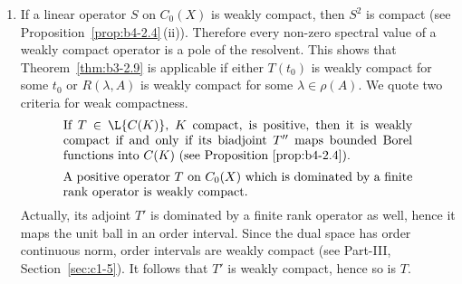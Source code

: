 \begin{remarks}
\begin{enumerate}[\upshape (i), wide, labelindent=.25em]
	We sketch the proof of the equivalence of (a) and (b)
    assuming that $s(A) = 0$.
	If\/ $0$ is a first order pole, then the residue $P$ is a positive projection satisfying $PE = \Kern{A}$, $P'E' = \Kern{A'}$ (see Part-I, Example~\ref{ex:a3-3.6}).
	Thus given $0 < f \in \Kern{A}$ and any $0 \leq \psi \in E'$ such that $\langle f,\psi \rangle > 0$, we have for $\phi \coloneqq P'\psi \in \Kern{A'}$, and
    \[
    \langle f,\phi \rangle = \langle f, P'\psi \rangle = \langle Pf,\psi \rangle = \langle f,\psi \rangle > 0\,.
    \]
	To prove the reverse direction, we first observe that the highest coefficient $Q_{k}$ of the Laurent expansion is a positive operator.
	Thus if\/ $0$ is a pole of order $k \geq 2$, we choose $0 < h \in E$ such that $f \coloneqq Q_{k}h > 0$.
	Then $Af = AQ_{k}h = 0$ and for every $\phi \in \Kern{A'}$ we have 
    \[
    \langle f,\phi \rangle = \langle Q_{k}h,\phi \rangle = \langle h,Q_{k}'\phi \rangle = \langle h,Q_{k-1}'A'\phi \rangle = 0\,.
    \]
	\item 
	If a linear operator $S$ on $C_{0}(X)$ is weakly compact, then $S^{2}$ is compact (see Proposition~\ref{prop:b4-2.4}\,(ii)).
	Therefore every non-zero spectral value of a weakly compact operator is a pole of the resolvent.
	This shows that Theorem~\ref{thm:b3-2.9} is applicable if either $T(t_{0})$ is weakly compact for some $t_{0}$ or $R(\lambda,A)$ is weakly compact for some $\lambda \in \rho(A)$.
	We quote two criteria for weak compactness.
    \begin{equation}\label{eq:b3-2.31}
		\begin{minipage}{.8\textwidth}
    	If   $T \in \L{C(K)}$, $K$ compact, is positive, then it is weakly compact  	if and only if its biadjoint 	$T''$ maps bounded Borel functions into $C(K)$ (see Proposition~\ref{prop:b4-2.4}).
    	\end{minipage}
	\end{equation}
	\begin{equation}\label{eq:b3-2.32}
        \begin{minipage}{.8\textwidth}
    		A positive operator   $T$ on $C_{0}(X)$ which is dominated by a finite rank 
    		operator is weakly compact. 
    	\end{minipage}
    \end{equation}
    Actually, its adjoint  $T'$ is dominated by a finite rank operator as well, hence it maps the unit ball in an order interval. Since the dual space has order continuous norm, order intervals are weakly compact (see Part-III, Section~\ref{sec:c1-5}). 
	It follows that $ T' $  is weakly compact, hence so is $T$.		
		

\end{enumerate}
\end{remarks}
